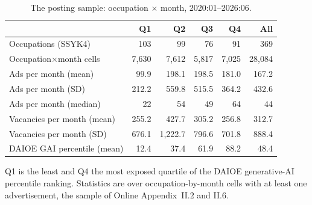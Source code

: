 \begin{table}[ht!]
\centering
\footnotesize
\caption{The posting sample: occupation $\times$ month, 2020:01--2026:06.}
\label{tab:sumstats_postings_v3}
\begin{tabular}{@{}lrrrrr@{}}
\toprule
 & Q1 & Q2 & Q3 & Q4 & All \\
\midrule
Occupations (SSYK4) & 103 & 99 & 76 & 91 & 369 \\
Occupation$\times$month cells & 7,630 & 7,612 & 5,817 & 7,025 & 28,084 \\[4pt]
Ads per month (mean) & 99.9 & 198.1 & 198.5 & 181.0 & 167.2 \\
Ads per month (SD) & 212.2 & 559.8 & 515.5 & 364.2 & 432.6 \\
Ads per month (median) & 22 & 54 & 49 & 64 & 44 \\[4pt]
Vacancies per month (mean) & 255.2 & 427.7 & 305.2 & 256.8 & 312.7 \\
Vacancies per month (SD) & 676.1 & 1,222.7 & 796.6 & 701.8 & 888.4 \\[4pt]
DAIOE GAI percentile (mean) & 12.4 & 37.4 & 61.9 & 88.2 & 48.4 \\
\bottomrule
\end{tabular}
\begin{minipage}{0.95\textwidth}\footnotesize\vspace{4pt}Q1 is the least and Q4 the most exposed quartile of the DAIOE generative-AI percentile ranking. Statistics are over occupation-by-month cells with at least one advertisement, the sample of Online Appendix~II.2 and II.6.
\end{minipage}
\end{table}
